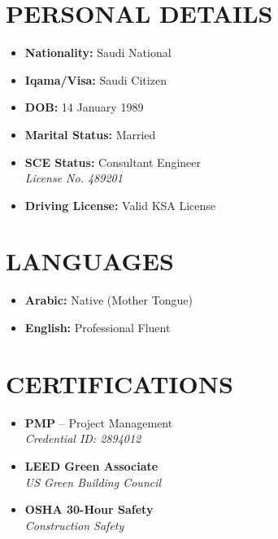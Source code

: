 \documentclass[10pt,a4paper]{article}
\begin{document}
\noindent
\begin{minipage}[t]{0.32\textwidth}
    \section*{PERSONAL DETAILS}
    \begin{itemize}[label={}, leftmargin=0pt, itemsep=5pt]
        \item \textbf{Nationality:} Saudi National
        \item \textbf{Iqama/Visa:} Saudi Citizen
        \item \textbf{DOB:} 14 January 1989
        \item \textbf{Marital Status:} Married
        \item \textbf{SCE Status:} Consultant Engineer \\[-0.1cm]
              \textit{License No. 489201}
        \item \textbf{Driving License:} Valid KSA License
    \end{itemize}
    
    \vspace{0.3cm}
    
    \section*{LANGUAGES}
    \begin{itemize}[label={}, leftmargin=0pt, itemsep=5pt]
        \item \textbf{Arabic:} Native (Mother Tongue)
        \item \textbf{English:} Professional Fluent
    \end{itemize}
    
    \vspace{0.3cm}
    
    \section*{CERTIFICATIONS}
    \begin{itemize}[label={}, leftmargin=0pt, itemsep=5pt]
        \item \textbf{PMP} -- Project Management \\[-0.1cm]
              \textit{Credential ID: 2894012}
        \item \textbf{LEED Green Associate} \\[-0.1cm]
              \textit{US Green Building Council}
        \item \textbf{OSHA 30-Hour Safety} \\[-0.1cm]
              \textit{Construction Safety}
    \end{itemize}
    

\end{minipage}
\end{document}
